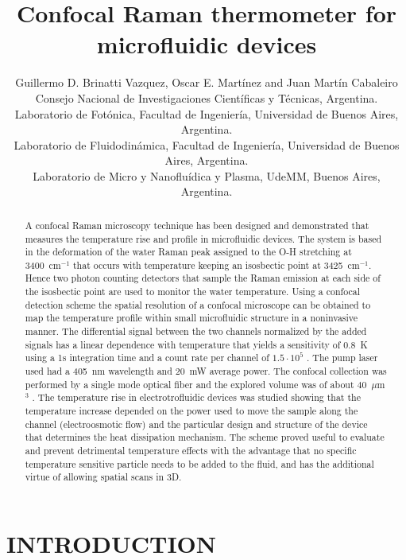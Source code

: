 \documentclass[]{spie}  %
\title{Confocal Raman thermometer for microfluidic devices}
\author{Guillermo D. Brinatti Vazquez\supit{a,b}, Oscar E. Martínez\supit{a,b} and Juan Martín Cabaleiro\supit{a,c,d}
\skiplinehalf
\supit{a} Consejo Nacional de Investigaciones Científicas y Técnicas, Argentina. \\
\supit{b} Laboratorio de Fotónica, Facultad de Ingeniería, Universidad de Buenos Aires, Argentina.\\
\supit{c} Laboratorio de Fluidodinámica, Facultad de Ingeniería, Universidad de Buenos Aires, Argentina.\\
\supit{d} Laboratorio de Micro y Nanofluídica y Plasma, UdeMM, Buenos Aires, Argentina.
}
\begin{document}
 
  \maketitle 

\begin{abstract}
A confocal Raman microscopy technique has been designed and demonstrated that measures the
temperature rise and profile in microfluidic devices. The system is based in the deformation of the water
Raman peak assigned to the O-H stretching at 3400~cm$^{-1}$ that occurs with temperature keeping an
isosbectic point at 3425~cm$^{-1}$. Hence two photon counting detectors that sample the Raman emission at
each side of the isosbectic point are used to monitor the water temperature. Using a confocal detection
scheme the spatial resolution of a confocal microscope can be obtained to map the temperature profile
within small microfluidic structure in a noninvasive manner. The differential signal between the two
channels normalized by the added signals has a linear dependence with temperature that yields a
sensitivity of 0.8~K using a 1s integration time and a count rate per channel of $1.5\cdot 10^5$ . The pump laser used had a 405~nm wavelength and 20~mW average power. The confocal collection was performed by a
single mode optical fiber and the explored volume was of about 40~$\mu$m$^3$ . The temperature rise in
electrotrofluidic devices was studied showing that the temperature increase depended on the power
used to move the sample along the channel (electroosmotic flow) and the particular design and
structure of the device that determines the heat dissipation mechanism. The scheme proved useful to
evaluate and prevent detrimental temperature effects with the advantage that no specific temperature
sensitive particle needs to be added to the fluid, and has the additional virtue of allowing spatial scans in
3D.
\end{abstract}



\section{INTRODUCTION}
\end{document}
